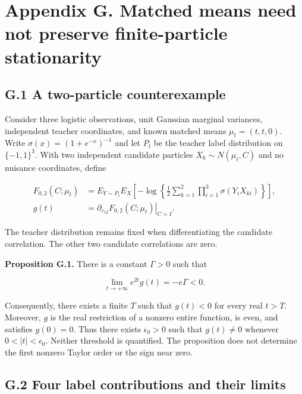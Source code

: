 \documentclass{article}
\begin{document}
\clearpage

\section*{Appendix G. Matched means need not preserve finite-particle
stationarity}\label{appendix-g.-matched-means-need-not-preserve-finite-particle-stationarity}

\subsection*{G.1 A two-particle
counterexample}\label{g.1-a-two-particle-counterexample}

Consider three logistic observations, unit Gaussian marginal variances,
independent teacher coordinates, and known matched means
\(\mu_t=(t,t,0)\). Write \(\sigma(x)=(1+e^{-x})^{-1}\) and let \(P_t\)
be the teacher label distribution on \(\{-1,1\}^3\). With two
independent candidate particles \(X_k\sim N(\mu_t,C)\) and no nuisance
coordinates, define

\[
\begin{aligned}
F_{0,2}(C;\mu_t)
&=E_{Y\sim P_t}E_X\left[-\log\left\{\frac12\sum_{k=1}^2
\prod_{i=1}^3\sigma(Y_iX_{ki})\right\}\right],\\
g(t)&=\left.\partial_{c_{12}}F_{0,2}(C;\mu_t)\right|_{C=I}.
\end{aligned}
\tag{G.1}
\]

The teacher distribution remains fixed when differentiating the
candidate correlation. The other two candidate correlations are zero.

\textbf{Proposition G.1.} There is a constant \(\Gamma>0\) such that

\[
\lim_{t\to+\infty}e^{2t}g(t)=-e\Gamma<0.
\tag{G.2}
\]

Consequently, there exists a finite \(T\) such that \(g(t)<0\) for every
real \(t>T\). Moreover, \(g\) is the real restriction of a nonzero
entire function, is even, and satisfies \(g(0)=0\). Thus there exists
\(\epsilon_0>0\) such that \(g(t)\ne0\) whenever \(0<|t|<\epsilon_0\).
Neither threshold is quantified. The proposition does not determine the
first nonzero Taylor order or the sign near zero.

\subsection*{G.2 Four label contributions and their
limits}\label{g.2-four-label-contributions-and-their-limits}
\end{document}
